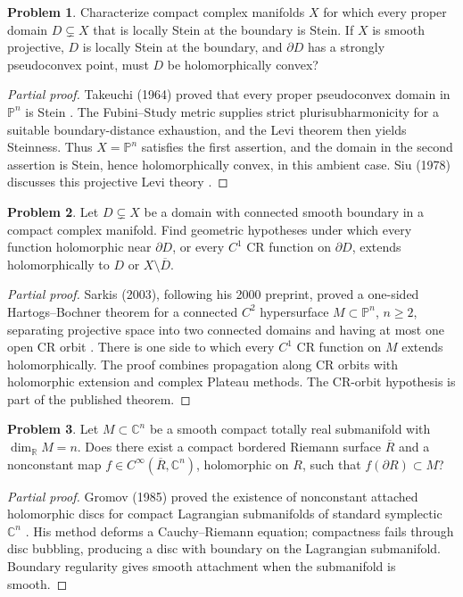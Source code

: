 \documentclass[11pt,reqno]{amsart}
\theoremstyle{definition}
\newtheorem{problem}{Problem}[section]
\theoremstyle{remark}
\begin{document}
\begin{problem}\label{b95-4-1-2}\label{FS-3.14}
Characterize compact complex manifolds $X$ for which every proper domain $D\subsetneq X$ that is locally Stein at the boundary is Stein. If $X$ is smooth projective, $D$ is locally Stein at the boundary, and $\partial D$ has a strongly pseudoconvex point, must $D$ be holomorphically convex?
\end{problem}
\begin{proof}[Partial proof]
Takeuchi (1964) proved that every proper pseudoconvex domain in $\mathbb P^n$ is Stein \cite{SM-Takeuchi64}. The Fubini--Study metric supplies strict plurisubharmonicity for a suitable boundary-distance exhaustion, and the Levi theorem then yields Steinness. Thus $X=\mathbb P^n$ satisfies the first assertion, and the domain in the second assertion is Stein, hence holomorphically convex, in this ambient case. Siu (1978) discusses this projective Levi theory \cite{FS-SiuLevi}.
\end{proof}

\begin{problem}\label{FS-3.9}
Let $D\subsetneq X$ be a domain with connected smooth boundary in a compact complex manifold. Find geometric hypotheses under which every function holomorphic near $\partial D$, or every $C^1$ CR function on $\partial D$, extends holomorphically to $D$ or $X\setminus\overline D$.
\end{problem}
\begin{proof}[Partial proof]
Sarkis (2003), following his 2000 preprint, proved a one-sided Hartogs--Bochner theorem for a connected $C^2$ hypersurface $M\subset\mathbb P^n$, $n\geq2$, separating projective space into two connected domains and having at most one open CR orbit \cite{SM-Sarkis03}. There is one side to which every $C^1$ CR function on $M$ extends holomorphically. The proof combines propagation along CR orbits with holomorphic extension and complex Plateau methods. The CR-orbit hypothesis is part of the published theorem.
\end{proof}

\begin{problem}\label{FS-3.13}
Let $M\subset\mathbb C^n$ be a smooth compact totally real submanifold with $\dim_{\mathbb R}M=n$. Does there exist a compact bordered Riemann surface $\overline R$ and a nonconstant map $f\in C^\infty(\overline R,\mathbb C^n)$, holomorphic on $R$, such that $f(\partial R)\subset M$?
\end{problem}
\begin{proof}[Partial proof]
Gromov (1985) proved the existence of nonconstant attached holomorphic discs for compact Lagrangian submanifolds of standard symplectic $\mathbb C^n$ \cite{FS-Gromov}. His method deforms a Cauchy--Riemann equation; compactness fails through disc bubbling, producing a disc with boundary on the Lagrangian submanifold. Boundary regularity gives smooth attachment when the submanifold is smooth.
\end{proof}
\end{document}
